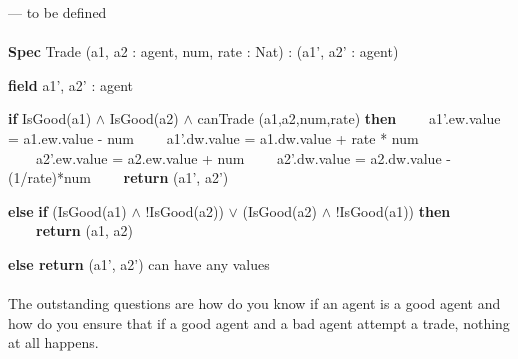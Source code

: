 \documentclass{article}
\begin{document}
\tab --- to be defined
\\\\
\textbf{Spec} Trade (a1, a2 : agent, num, rate : Nat) : (a1', a2' : agent) 

\tab\textbf{field} a1', a2' : agent

\tab\textbf{if} IsGood(a1) $\wedge$ IsGood(a2) $\wedge$ canTrade (a1,a2,num,rate) \textbf{then}
\tab\tab \ \ \ \ a1'.ew.value = a1.ew.value - num
\tab\tab \ \ \ \ a1'.dw.value = a1.dw.value + rate * num
\tab\tab \ \ \ \ a2'.ew.value = a2.ew.value + num
\tab\tab \ \ \ \ a2'.dw.value = a2.dw.value - (1/rate)*num
\tab\tab\ \ \ \ \textbf{return} (a1', a2')

\tab\textbf{else} \textbf{if} (IsGood(a1) $\wedge$ $!$IsGood(a2))  $\vee$ (IsGood(a2) $\wedge$ $!$IsGood(a1)) \textbf{then}
\tab\tab\ \ \ \ \textbf{return} (a1, a2)

\tab\textbf{else return} (a1', a2') can have any values
\\ \\
\rm{The outstanding questions are how do you know if an agent is a good agent and how do you ensure that if a good agent and a bad agent attempt a trade, nothing at all happens.}
\\ \\
\end{document}
